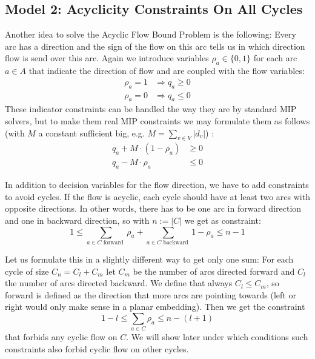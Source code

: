 \subsection{Model 2: Acyclicity Constraints On All Cycles}
\label{model:AcyclicityConstraints}
Another idea to solve the Acyclic Flow Bound Problem 
is the following: Every arc has a direction and the 
sign of the flow on this arc tells us in which direction flow is send over this arc. Again we introduce variables 
$\rho_a\in \{0,1\}$ for each arc $a\in A$ that indicate the direction of flow and are coupled with the flow variables:
\begin{align*}
\rho_a=1 & \Rightarrow q_a\ge 0 \\
\rho_a=0 & \Rightarrow q_a\le 0
\end{align*}
These indicator constraints can be handled the way they are by standard MIP solvers, but to make them real MIP 
constraints we may formulate them as follows (with $M$ a constant sufficient big, e.g. $M=\sum_{v\in V}|d_v|$) :
\begin{align*}
 q_a + M\cdot (1-\rho_a) &\ge 0\\
 q_a - M\cdot \rho_a & \le 0
\end{align*}

In addition to decision variables for the flow direction, we have to add constraints to avoid cycles. If the flow is 
acyclic, each cycle should have at least two arcs with opposite directions. In other words, there has to be one arc
in forward direction and one in backward direction, so with $n:=|C|$ we get as constraint:
$$ 1\le\sum_{a\in C\textrm{ forward }} \rho_a + \sum_{a\in C\textrm{ backward }}1-\rho_a\le n-1$$

Let us formulate this in a slightly different way to get only one sum: For each cycle of size $C_n=C_l+C_m$ 
let $C_m$ be the number of arcs directed forward and $C_l$ the number of arcs directed backward. We define that always 
$C_l\le C_m$, so forward is defined as the direction that more arcs are pointing towards (left or right would only 
make sense in a planar embedding). Then we get the constraint $$1-l \le \sum_{a\in C}\rho_a\le n-(l+1)$$ that forbids 
any cyclic flow on $C$. We will show later under which conditions such constraints also forbid cyclic flow on other 
cycles. 

